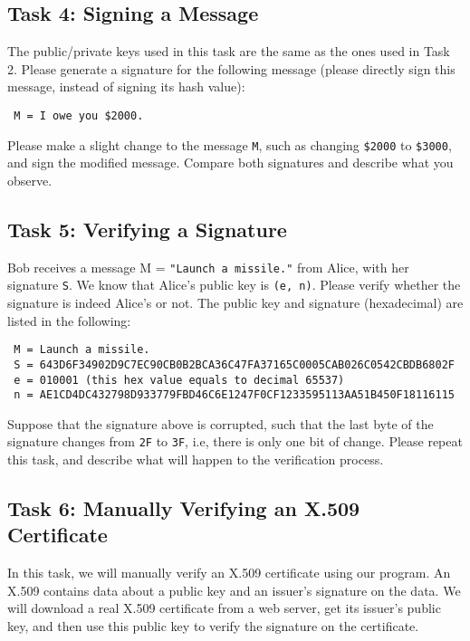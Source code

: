 \subsection{Task 4: Signing a Message}

The public/private keys used in this task are the same as the ones used in Task 2.
Please generate a signature for the following message (please directly sign this message,
instead of signing its hash value):

\begin{lstlisting}
 M = I owe you $2000.
\end{lstlisting}

Please make a slight change to the message \texttt{M}, such as changing \texttt{\$2000}
to \texttt{\$3000}, and sign the modified message. Compare both signatures and describe what
you observe.


\subsection{Task 5: Verifying a Signature}

Bob receives a message M = \texttt{"Launch a missile."} from
Alice, with her signature \texttt{S}. We know that Alice's public key is \texttt{(e, n)}.
Please verify whether the signature is indeed Alice's or not.
The public key and signature (hexadecimal) are listed in the following:

\begin{lstlisting}
 M = Launch a missile.
 S = 643D6F34902D9C7EC90CB0B2BCA36C47FA37165C0005CAB026C0542CBDB6802F
 e = 010001 (this hex value equals to decimal 65537)
 n = AE1CD4DC432798D933779FBD46C6E1247F0CF1233595113AA51B450F18116115
\end{lstlisting}


Suppose that the signature above is corrupted, such that the
last byte of the signature changes from \texttt{2F} to \texttt{3F}, i.e, there is only one bit
of change.  Please repeat this task,
and describe what will happen to the verification process.




\subsection{Task 6: Manually Verifying an X.509 Certificate}

In this task, we will manually verify an X.509 certificate using our program.
An X.509 contains data about a public key and an issuer's signature on the data.
We will download a real X.509 certificate from a web server, get its issuer's public key, and then
use this public key to verify the signature on the certificate.


